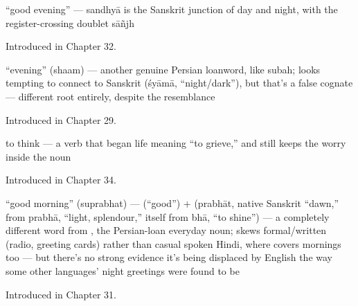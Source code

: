 \noindent\begin{minipage}[t]{\linewidth}
\raggedright
\textbf{ }\par
\small \textquotedblleft{}good evening\textquotedblright{} — sandhyā is the Sanskrit junction of day and night, with the register-crossing doublet sāñjh\par
\footnotesize Introduced in Chapter 32.
\end{minipage}\par\medskip

\noindent\begin{minipage}[t]{\linewidth}
\raggedright
\textbf{}\par
\small \textquotedblleft{}evening\textquotedblright{} (shaam) — another genuine Persian loanword, like subah; looks tempting to connect to Sanskrit  (śyāmā, \textquotedblleft{}night/dark\textquotedblright{}), but that's a false cognate — different root entirely, despite the resemblance\par
\footnotesize Introduced in Chapter 29.
\end{minipage}\par\medskip

\noindent\begin{minipage}[t]{\linewidth}
\raggedright
\textbf{}\par
\small to think — a verb that began life meaning \textquotedblleft{}to grieve,\textquotedblright{} and still keeps the worry inside the noun \par
\footnotesize Introduced in Chapter 34.
\end{minipage}\par\medskip

\noindent\begin{minipage}[t]{\linewidth}
\raggedright
\textbf{}\par
\small \textquotedblleft{}good morning\textquotedblright{} (suprabhat) —  (\textquotedblleft{}good\textquotedblright{}) +  (prabhāt, native Sanskrit \textquotedblleft{}dawn,\textquotedblright{} from prabhā, \textquotedblleft{}light, splendour,\textquotedblright{} itself from bhā, \textquotedblleft{}to shine\textquotedblright{}) — a completely different word from , the Persian-loan everyday noun; skews formal/written (radio, greeting cards) rather than casual spoken Hindi, where  covers mornings too — but there's no strong evidence it's being displaced by English the way some other languages' night greetings were found to be\par
\footnotesize Introduced in Chapter 31.
\end{minipage}\par\medskip

